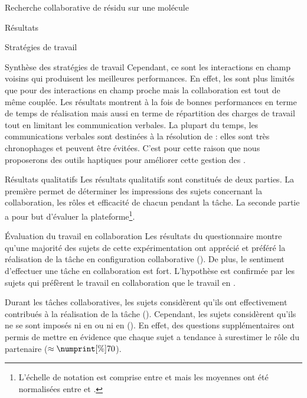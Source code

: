 \documentclass[myfrancais,ngerman,english,frenchb]{mythesis}
\begin{document}
\begin{mychapter}{Recherche collaborative de résidu sur une molécule}
\begin{mysection}{Résultats}
\begin{mysubsection}{Stratégies de travail}
\begin{mysubsubsection}{Synthèse des stratégies de travail}
					Cependant, ce sont les interactions en champ voisins qui produisent les meilleures performances.
					En effet, les  sont plus limités que pour des interactions en champ proche mais la collaboration est tout de même couplée.
					Les résultats montrent à la fois de bonnes performances en terme de temps de réalisation mais aussi en terme de répartition des charges de travail tout en limitant les communication verbales.
					La plupart du temps, les communications verbales sont destinées à la résolution de  : elles sont très chronophages et peuvent être évitées.
					C'est pour cette raison que nous proposerons des outils haptiques pour améliorer cette gestion des  .
				\end{mysubsubsection}
			\end{mysubsection}
			\begin{mysubsection}{Résultats qualitatifs}
				Les résultats qualitatifs sont constitués de deux parties.
				La première permet de déterminer les impressions des sujets concernant la collaboration, les rôles et efficacité de chacun pendant la tâche.
				La seconde partie a pour but d'évaluer la plateforme\footnote{L'échelle de notation est comprise entre  et  mais les moyennes ont été normalisées entre  et .}.
				\begin{mysubsubsection}{Évaluation du travail en collaboration}
					Les résultats du questionnaire montre qu'une majorité des sujets de cette expérimentation ont apprécié et préféré la réalisation de la tâche en configuration collaborative ().
					De plus, le sentiment d'effectuer une tâche en collaboration est fort.
					L'hypothèse  est confirmée par les sujets qui préfèrent le travail en collaboration que le travail en .

					Durant les tâches collaboratives, les sujets considèrent qu'ils ont effectivement contribués à la réalisation de la tâche ().
					Cependant, les sujets considèrent qu'ils ne se sont imposés ni en  ou ni en  ().
					En effet, des questions supplémentaires ont permis de mettre en évidence que chaque sujet a tendance à surestimer le rôle du partenaire ($\approx\mynum[\%]{70}$).


\end{mysubsubsection}
\end{mysubsection}
\end{mysection}
\end{mychapter}
\end{document}
